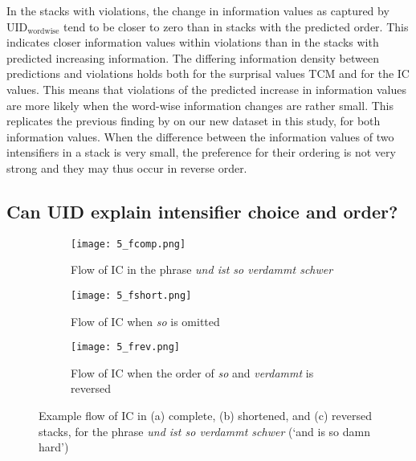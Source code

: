 \documentclass[output=paper,colorlinks,citecolor=brown]{langscibook}
\begin{document}
In the stacks with violations, the change in information values as captured by  $\mathrm{UID_{wordwise}}$ tend to be closer to zero than in stacks with the predicted order. This indicates closer information values within violations than in the  stacks with predicted increasing information. 
The differing information density between predictions and violations holds both for the surprisal values TCM and for the IC values. This means that violations of the predicted increase in information values are more likely when the word-wise information changes are rather small. This replicates the previous finding by \citet{scherihou2022} on our new dataset in this study, for both information values. When the difference between the information values of two intensifiers in a stack is very small, the preference for their ordering is not very strong and they may thus occur in reverse order. 
\largerpage

\subsection{Can UID explain intensifier choice and order?}\label{ssec:uid_intensifier_choice}


  
\begin{figure}[b]
  \centering
  \begin{subfigure}[t]{0.4\textwidth}
    \texttt{[image: 5\_fcomp.png]}
    \caption{Flow of IC in the phrase \textit{und ist so verdammt schwer}}
    \label{fig:flow-complete}
  \end{subfigure}
  \qquad
  \begin{subfigure}[t]{0.4\textwidth}
    \texttt{[image: 5\_fshort.png]}
    \caption{Flow of IC when \textit{so} is omitted}
    \label{fig:flow-short}
  \end{subfigure}
 
  \begin{subfigure}[t]{0.4\textwidth}
    \texttt{[image: 5\_frev.png]}
    \caption{Flow of IC when the order of \textit{so} and \textit{verdammt} is reversed}
    \label{fig:flow-reverse}
  \end{subfigure}

\caption{Example flow of IC in (a) complete, (b) shortened, and (c) reversed stacks, for the phrase \textit{und ist so verdammt schwer} (`and is so damn hard')}
\label{fig:flow}
\end{figure}
\end{document}
